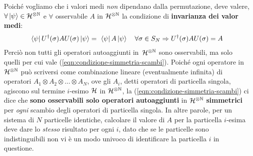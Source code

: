\documentclass[../../FisicaTeorica.tex]{subfiles}
\begin{document}
Poiché vogliamo che i valori medi \textit{non} dipendano dalla permutazione, deve valere, $\forall \Ket{\psi}\in \mathcal{H}^{\otimes \mathbb{N}}$ e $\forall$ osservabile $A$ in $\mathcal{H}^{\otimes \mathbb{N}}$ la condizione di \textbf{invarianza dei valor medi}:
\begin{align}
\bra{\psi} U^\dag(\sigma)AU(\sigma)\ket{\psi} =\ \bra{\psi}A\ket{\psi}\quad \forall \sigma \in S_N \Rightarrow U^\dag(\sigma)AU(\sigma)=A
\label{eqn:condizione-simmetria-scambi}
\end{align}
Perciò non tutti gli operatori autoaggiunti in\ $\mathcal{H}^{\otimes \mathbb{N}}$ sono osservabili, ma solo quelli per cui vale (\ref{eqn:condizione-simmetria-scambi}). Poiché ogni operatore in $\mathcal{H}^{\otimes \mathbb{N}}$ può scriversi come combinazione lineare (eventualmente infinita) di operatori $A_1 \otimes A_2 \otimes \dots \otimes A_N$, ove gli $A_i$, detti operatori di particella singola, agiscono sul termine $i$-esimo $\mathcal{H}$ in $\mathcal{H}^{\otimes \mathbb{N}}$, la (\ref{eqn:condizione-simmetria-scambi}) ci dice che \textbf{sono osservabili solo operatori autoaggiunti} in $\mathcal{H}^{\otimes \mathbb{N}}$ \textbf{simmetrici} per \textit{ogni} scambio degli operatori di particella singola. In altre parole, per un sistema di $N$ particelle identiche, calcolare il valore di $A$ per la particella $i$-esima deve dare lo \textit{stesso} risultato per ogni $i$, dato che se le particelle sono indistinguibili non vi è un modo univoco di identificare la particella $i$ in questione.\\
\end{document}
